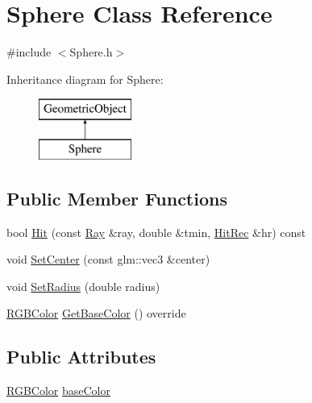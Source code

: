\hypertarget{class_sphere}{\section{Sphere Class Reference}
\label{class_sphere}
}


{\ttfamily \#include $<$Sphere.\-h$>$}

Inheritance diagram for Sphere\-:\begin{figure}[H]
\begin{center}
\leavevmode
\includegraphics[height=2.000000cm]{class_sphere}
\end{center}
\end{figure}
\subsection*{Public Member Functions}
\begin{DoxyCompactItemize}
\item 
bool \hyperlink{class_sphere_abfe41f348343d7d1dd4a6e5c384c615d}{Hit} (const \hyperlink{class_ray}{Ray} \&ray, double \&tmin, \hyperlink{class_hit_rec}{Hit\-Rec} \&hr) const 
\item 
void \hyperlink{class_sphere_a2b8aef309428ea904c75ce3300a71e09}{Set\-Center} (const glm\-::vec3 \&center)
\item 
void \hyperlink{class_sphere_a3d00bdfc296c57832f92f96c8095f90d}{Set\-Radius} (double radius)
\item 
\hyperlink{class_r_g_b_color}{R\-G\-B\-Color} \hyperlink{class_sphere_a1a1446f19a193f966cb04704faa3c3e8}{Get\-Base\-Color} () override
\end{DoxyCompactItemize}
\subsection*{Public Attributes}
\begin{DoxyCompactItemize}
\item 
\hyperlink{class_r_g_b_color}{R\-G\-B\-Color} \hyperlink{class_sphere_a2dc9c91cfd7554ba873a36c8ca277729}{base\-Color}
\end{DoxyCompactItemize}


